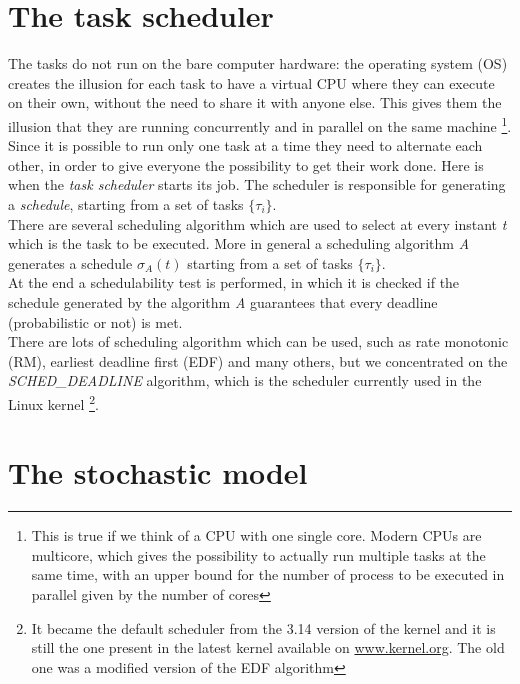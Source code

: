 \section{The task scheduler}
The tasks do not run on the bare computer hardware: the operating system (OS) creates the illusion for each task to have a virtual CPU where they can execute on their own, without the need to share it with anyone else. This gives them the illusion that they are running concurrently and in parallel on the same machine \footnote{This is true if we think of a CPU with one single core. Modern CPUs are multicore, which gives the possibility to actually run multiple tasks at the same time, with an upper bound for the number of process to be executed in parallel given by the number of cores}.\\
Since it is possible to run only one task at a time they need to alternate each other, in order to give everyone the possibility to get their work done. Here is when the \emph{task scheduler} starts its job. The scheduler is responsible for generating a \emph{schedule}, starting from a set of tasks \( \{\tau_{i}\} \).\\
There are several scheduling algorithm which are used to select at every instant \emph{t} which is the task to be executed. More in general a scheduling algorithm \emph{A} generates a schedule \( \sigma_{A}\left(t\right) \) starting from a set of tasks \( \{\tau_{i}\} \).\\
At the end a schedulability test is performed, in which it is checked if the schedule generated by the algorithm \emph{A} guarantees that every deadline (probabilistic or not) is met.\\
There are lots of scheduling algorithm which can be used, such as rate monotonic (RM), earliest deadline first (EDF) and many others, but we concentrated on the \emph{SCHED\_DEADLINE} algorithm, which is the scheduler currently used in the Linux kernel \footnote{It became the default scheduler from the 3.14 version of the kernel and it is still the one present in the latest kernel available on \url{www.kernel.org}. The old one was a modified version of the EDF algorithm}.\\


\section{The stochastic model}
